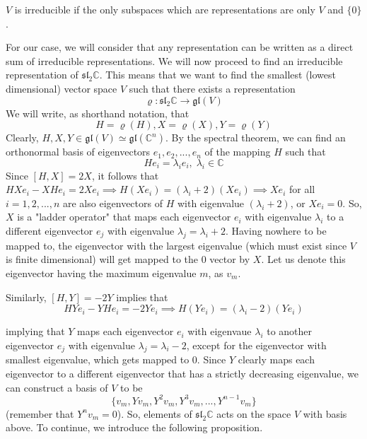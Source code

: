   \begin{definition}
    $V$ is irreducible if the only subspaces which are representations are only $V$ and $\{0\}$. 
  \end{definition}

  For our case, we will consider that any representation can be written as a direct sum of irreducible representations. We will now proceed to find an irreducible representation of $\mathfrak{sl}_2 \mathbb{C}$. This means that we want to find the smallest (lowest dimensional) vector space $V$ such that there exists a representation
  \begin{equation}
    \varrho: \mathfrak{sl}_2 \mathbb{C} \rightarrow \mathfrak{gl}(V)
  \end{equation}
  We will write, as shorthand notation, that 
  \begin{equation}
    H = \varrho(H), X = \varrho(X), Y = \varrho(Y)
  \end{equation}
  Clearly, $H, X, Y \in \mathfrak{gl}(V) \simeq \mathfrak{gl}(\mathbb{C}^n)$. By the spectral theorem, we can find an orthonormal basis of eigenvectors $e_1, e_2, ..., e_n$ of the mapping $H$ such that
  \begin{equation}
    H e_i = \lambda_i e_i, \; \lambda_i \in \mathbb{C}
  \end{equation}
  Since $[H,X] = 2X$, it follows that $HX e_i - X H e_i = 2X e_i \implies H (X e_i) = (\lambda_i + 2) (X e_i) \implies Xe_i$ for all $i = 1, 2, ..., n$ are also eigenvectors of $H$ with eigenvalue $(\lambda_i + 2)$, or $X e_i = 0$. So, $X$ is a "ladder operator" that maps each eigenvector $e_i$ with eigenvalue $\lambda_i$ to a different eigenvector $e_j$ with eigenvalue $\lambda_j = \lambda_i + 2$. Having nowhere to be mapped to, the eigenvector with the largest eigenvalue (which must exist since $V$ is finite dimensional) will get mapped to the $0$ vector by $X$. Let us denote this eigenvector having the maximum eigenvalue $m$, as $v_m$. 

  Similarly, $[H,Y] = -2Y$ implies that
  \begin{equation}
    HY e_i - YH e_i = -2Y e_i \implies H(Y e_i) = (\lambda_i - 2)(Y e_i)
  \end{equation}

  implying that $Y$ maps each eigenvector $e_i$ with eigenvaue $\lambda_i$ to another eigenvector $e_j$ with eigenvalue $\lambda_j = \lambda_i - 2$, except for the eigenvector with smallest eigenvalue, which gets mapped to $0$. Since $Y$ clearly maps each eigenvector to a different eigenvector that has a strictly decreasing eigenvalue, we can construct a basis of $V$ to be
  \begin{equation}
    \{v_m, Y v_m, Y^2 v_m, Y^3 v_m, ..., Y^{n-1} v_m\}
  \end{equation}
  (remember that $Y^n v_m = 0$). So, elements of $\mathfrak{sl}_2 \mathbb{C}$ acts on the space $V$ with basis above. To continue, we introduce the following proposition. 

